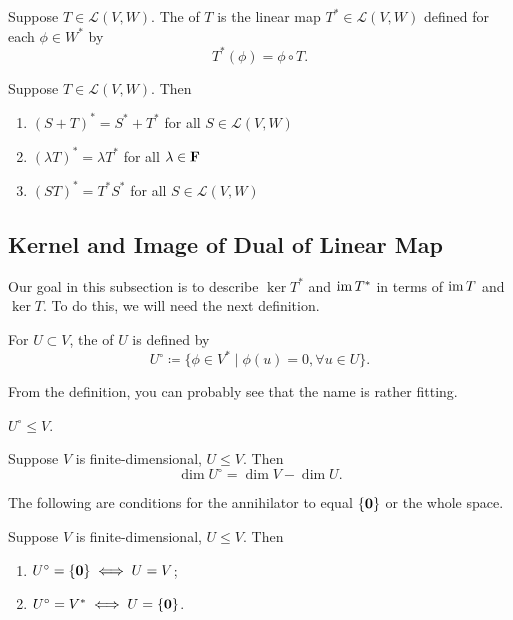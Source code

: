 \begin{definition}
Suppose $T\in\mathcal{L}(V,W)$. The  of $T$ is the linear map $T^*\in\mathcal{L}(V,W)$ defined for each $\phi\in W^*$ by
\[T^*(\phi)=\phi\circ T.\]
\end{definition}

\begin{proposition}
Suppose $T\in\mathcal{L}(V,W)$. Then
\begin{enumerate}[label=(\arabic*)]
\item $(S+T)^*=S^*+T^*$ for all $S\in\mathcal{L}(V,W)$
\item $(\lambda T)^*=\lambda T^*$ for all $\lambda\in\mathbf F$
\item $(ST)^*=T^* S^*$ for all $S\in\mathcal{L}(V,W)$
\end{enumerate}
\end{proposition}

\subsection{Kernel and Image of Dual of Linear Map}
Our goal in this subsection is to describe $\ker T^*$ and $\operatorname{im} T^*$ in terms of $\operatorname{im} T$ and $\ker T$. To do this, we will need the next definition.

\begin{definition}[Annihilator]
For $U\subset V$, the  of $U$ is defined by
\[U^\circ\coloneqq\{\phi\in V^*\mid\phi(u)=0,\forall u\in U\}.\]
\end{definition}

From the definition, you can probably see that the name is rather fitting.

\begin{proposition}
$U^\circ\le V$.
\end{proposition}

\begin{proposition}
Suppose $V$ is finite-dimensional, $U\le V$. Then
\[\dim U^\circ=\dim V-\dim U.\]
\end{proposition}

The following are conditions for the annihilator to equal $\{\vb{0}\}$ or the whole space.

\begin{proposition}
Suppose $V$ is finite-dimensional, $U\le V$. Then
\begin{enumerate}[label=(\roman*)]
\item $U^\circ=\{\vb{0}\}\iff U=V$;
\item $U^\circ=V^*\iff U=\{\vb{0}\}$.
\end{enumerate}
\end{proposition}

